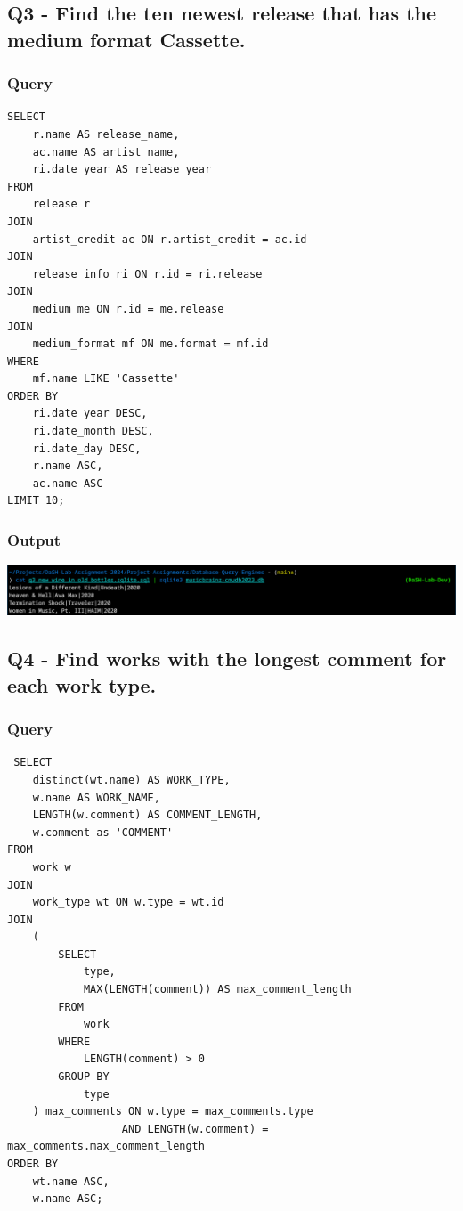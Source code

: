 \documentclass[11pt]{article}
\begin{document}
\subsection{Q3 - Find the ten newest release that has the medium format Cassette.}
\label{sec:org3aa3c59}
\subsubsection{Query}
\label{sec:org650f449}
\begin{verbatim}
SELECT
    r.name AS release_name,
    ac.name AS artist_name,
    ri.date_year AS release_year
FROM
    release r
JOIN
    artist_credit ac ON r.artist_credit = ac.id
JOIN
    release_info ri ON r.id = ri.release
JOIN
    medium me ON r.id = me.release
JOIN
    medium_format mf ON me.format = mf.id
WHERE
    mf.name LIKE 'Cassette'
ORDER BY
    ri.date_year DESC,
    ri.date_month DESC,
    ri.date_day DESC,
    r.name ASC,
    ac.name ASC
LIMIT 10;

\end{verbatim}
\subsubsection{Output}
\label{sec:orga958e55}
\begin{center}
\includegraphics[width=.9\linewidth]{./images/Q3.png}
\end{center}
\subsection{Q4 - Find works with the longest comment for each work type.}
\label{sec:orgcb060ce}
\subsubsection{Query}
\label{sec:org9c3a0f7}
\begin{verbatim}
 SELECT
    distinct(wt.name) AS WORK_TYPE,
    w.name AS WORK_NAME,
    LENGTH(w.comment) AS COMMENT_LENGTH,
    w.comment as 'COMMENT'
FROM
    work w
JOIN
    work_type wt ON w.type = wt.id
JOIN
    (
        SELECT
            type,
            MAX(LENGTH(comment)) AS max_comment_length
        FROM
            work
        WHERE
            LENGTH(comment) > 0
        GROUP BY
            type
    ) max_comments ON w.type = max_comments.type
                  AND LENGTH(w.comment) = max_comments.max_comment_length
ORDER BY
    wt.name ASC,
    w.name ASC;
\end{verbatim}
\end{document}
